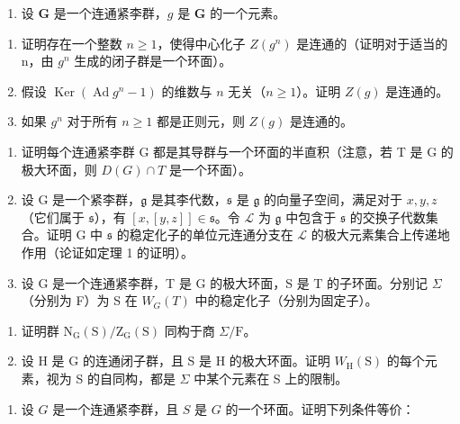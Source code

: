 
\begin{enumerate}
\def\labelenumi{\arabic{enumi})}
\tightlist
\item
  设 \(\mathbf{G}\) 是一个连通紧李群，\(g\) 是 \(\mathbf{G}\) 的一个元素。
\end{enumerate}

\begin{enumerate}
\def\labelenumi{\alph{enumi})}
\item
  证明存在一个整数 \(n \geq 1\)，使得中心化子 \(Z(g^{n})\) 是连通的（证明对于适当的 n，由 \(g^{n}\) 生成的闭子群是一个环面）。
\item
  假设 \(\operatorname{Ker}(\operatorname{Ad}g^n - 1)\) 的维数与 \(n\) 无关（\(n \geq 1\)）。证明 \(Z(g)\) 是连通的。
\item
  如果 \(g^n\) 对于所有 \(n \geq 1\) 都是正则元，则 \(Z(g)\) 是连通的。
\end{enumerate}

\begin{enumerate}
\def\labelenumi{\arabic{enumi})}
\setcounter{enumi}{1}
\item
  证明每个连通紧李群 G 都是其导群与一个环面的半直积（注意，若 T 是 G 的极大环面，则 \(D(G) \cap T\) 是一个环面）。
\item
  设 G 是一个紧李群，\(\mathfrak{g}\) 是其李代数，\(\mathfrak{s}\) 是 \(\mathfrak{g}\) 的向量子空间，满足对于 \(x, y, z\)（它们属于 \(\mathfrak{s}\)），有 \([x, [y, z]] \in \mathfrak{s}\)。令 \(\mathcal{L}\) 为 \(\mathfrak{g}\) 中包含于 \(\mathfrak{s}\) 的交换子代数集合。证明 G 中 \(\mathfrak{s}\) 的稳定化子的单位元连通分支在 \(\mathcal{L}\) 的极大元素集合上传递地作用（论证如定理 1 的证明）。
\item
  设 G 是一个连通紧李群，T 是 G 的极大环面，S 是 T 的子环面。分别记 \(\Sigma\)（分别为 F）为 S 在 \(W_{G}(T)\) 中的稳定化子（分别为固定子）。
\end{enumerate}

\begin{enumerate}
\def\labelenumi{\alph{enumi})}
\item
  证明群 \(\mathrm{N_G(S) / Z_G(S)}\) 同构于商 \(\Sigma /\mathrm{F}\)。
\item
  设 H 是 G 的连通闭子群，且 S 是 H 的极大环面。证明 \(W_{\mathrm{H}}(\mathrm{S})\) 的每个元素，视为 S 的自同构，都是 \(\Sigma\) 中某个元素在 S 上的限制。
\end{enumerate}

\begin{enumerate}
\def\labelenumi{\arabic{enumi})}
\setcounter{enumi}{4}
\tightlist
\item
  设 \(G\) 是一个连通紧李群，且 \(S\) 是 \(G\) 的一个环面。证明下列条件等价：
\end{enumerate}

